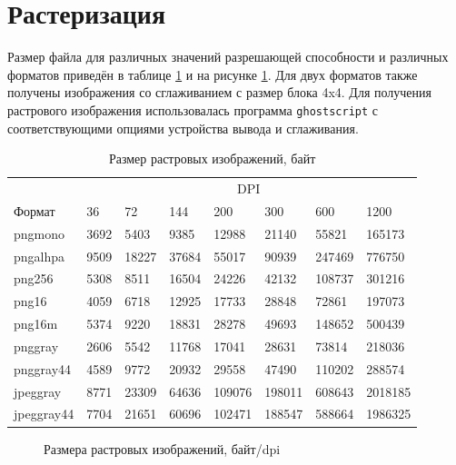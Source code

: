 \documentclass[11pt]{article}
\begin{document}
\section*{Растеризация}
Размер файла для различных значений разрешающей способности и различных форматов приведён в таблице \ref{tab:sizes} и на рисунке \ref{fig:sizes}. Для двух форматов также получены изображения со сглаживанием с размер блока 4x4. Для получения растрового изображения использовалась программа \texttt{ghostscript} с соответствующими опциями устройства вывода и сглаживания.

\begin{table}[h]
\begin{center}
	\begin{tabular}{llllllll}

	&\multicolumn{7}{c}{DPI} \\
	Формат & 36 & 72 & 144 & 200 & 300 & 600 & 1200\\
	pngmono  &  3692 & 5403 & 9385 & 12988 & 21140 & 55821 & 165173 \\
	pngalhpa  &  9509 & 18227 & 37684 & 55017 & 90939 & 247469 & 776750 \\
	png256 & 5308 & 8511 & 16504 & 24226 & 42132 & 108737  & 301216 \\
	png16 & 4059 & 6718 & 12925 & 17733 & 28848 & 72861 & 197073 \\
	png16m  &  5374 & 9220 & 18831 & 28278 & 49693 & 148652 & 500439 \\
	pnggray  &  2606 & 5542 & 11768 & 17041 & 28631 & 73814 & 218036 \\
	pnggray44  &  4589 & 9772 & 20932 & 29558 & 47490 & 110202 & 288574 \\
	jpeggray  &  8771 & 23309 & 64636 & 109076 & 198011 & 608643 & 2018185 \\
	jpeggray44  &  7704 & 21651 & 60696 & 102471 & 188547 & 588664 & 1986325
	\end{tabular}
	\caption{Размер растровых изображений, байт}
	\label{tab:sizes}
\end{center}
\end{table}

\begin{figure}[!h]
\begin{center}
  \begin{tiny}
  
  \end{tiny}  
  \caption{Размера растровых изображений, байт/dpi}
  \label{fig:sizes}
\end{center}
\end{figure}
\end{document}
